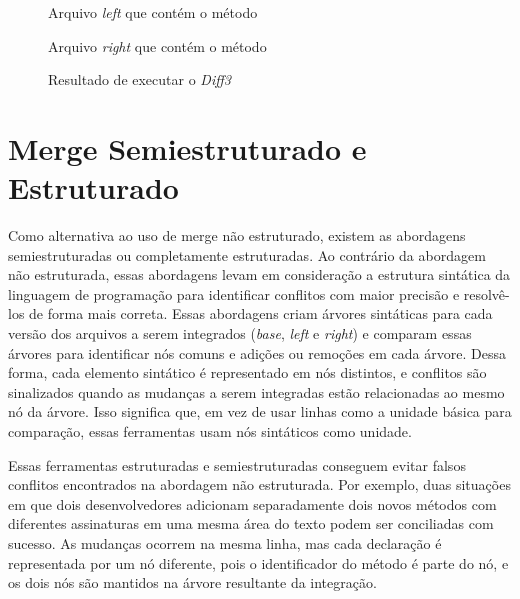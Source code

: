 \begin{figure}[ht]
	\begin{center}
		
		\caption{Arquivo \emph{left} que contém o método }\label{left_example}
	\end{center}
\end{figure}

\begin{figure}[ht]
	\begin{center}
		
		\caption{Arquivo \emph{right} que contém o método }\label{right_example}
	\end{center}
\end{figure}

\begin{figure}[ht]
	\begin{center}
		
	\end{center}
	\caption{Resultado de executar o \emph{Diff3}}\label{diff3_example}
\end{figure}

\section{Merge Semiestruturado e Estruturado}
Como alternativa ao uso de merge não estruturado, existem as abordagens
semiestruturadas ou completamente estruturadas. Ao contrário da abordagem não
estruturada, essas abordagens levam em consideração a estrutura sintática da
linguagem de programação para identificar conflitos com maior precisão e resolvê-los de
forma mais correta. Essas abordagens criam árvores sintáticas para
cada versão dos arquivos a serem integrados (\emph{base}, \emph{left} e \emph{right})
e comparam essas árvores para identificar nós comuns
e adições ou remoções em cada árvore. Dessa forma, cada elemento sintático
é representado em nós distintos, e conflitos são sinalizados quando as mudanças
a serem integradas estão relacionadas ao mesmo nó da árvore. Isso significa
que, em vez de usar linhas como a unidade básica para comparação, essas ferramentas usam
nós sintáticos como unidade.

Essas ferramentas estruturadas e semiestruturadas conseguem evitar falsos conflitos
encontrados na abordagem não estruturada. Por exemplo, duas situações em
que dois desenvolvedores adicionam separadamente dois novos métodos com diferentes
assinaturas em uma mesma área do texto podem ser conciliadas com sucesso.
As mudanças ocorrem na mesma linha, mas cada declaração é representada por
um nó diferente, pois o identificador do método é parte do nó,
e os dois nós são mantidos na árvore resultante da integração.

